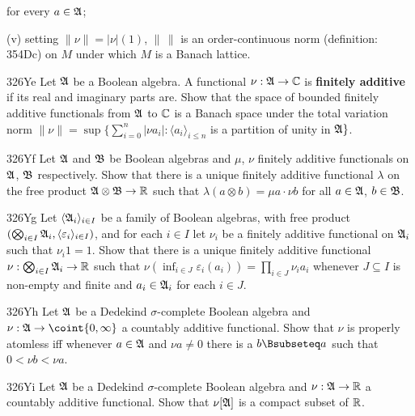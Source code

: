 {

\noindent for every $a\in\frak A$;

\quad(v) setting $\|\nu\|=|\nu|(1)$, $\|\,\|$ is an order-continuous
norm (definition:  354Dc) on $M$ under which $M$ is a Banach lattice.

\spheader 326Ye Let $\frak A$ be a Boolean algebra.   A functional
$\nu:\frak A\to\Bbb C$ is {\bf finitely additive} if its real and
imaginary parts are.
Show that the space of bounded finitely additive functionals from
$\frak A$ to $\Bbb C$ is a Banach space under the total variation norm
$\|\nu\|=\sup\{\sum_{i=0}^n|\nu a_i|:\langle a_i\rangle_{i\le n}$
is a partition of unity in $\frak A\}$.

\spheader 326Yf Let $\frak A$ and $\frak B$ be Boolean algebras and
$\mu$, $\nu$ finitely additive functionals on $\frak A$, $\frak B$
respectively.   Show that there is a unique finitely
additive functional $\lambda$ on the free product
$\frak A\otimes\frak B\to\Bbb R$ such that
$\lambda(a\otimes b)=\mu a\cdot\nu b$ for all $a\in\frak A$,
$b\in\frak B$.

\spheader 326Yg Let $\langle\frak A_i\rangle_{i\in I}$ be a family of
Boolean algebras, with free product
$(\bigotimes_{i\in I}\frak A_i,\langle\varepsilon_i\rangle_{i\in I})$,
and for each $i\in I$ let
$\nu_i$ be a finitely additive functional on $\frak A_i$ such that
$\nu_i1=1$.   Show that there is a unique finitely additive functional
$\nu:\bigotimes_{i\in I}\frak A_i\to\Bbb R$ such that
$\nu(\inf_{i\in J}\varepsilon_i(a_i))=\prod_{i\in J}\nu_ia_i$ whenever
$J\subseteq I$ is
non-empty and finite and $a_i\in\frak A_i$ for each $i\in J$.

\spheader 326Yh
Let $\frak A$ be a Dedekind $\sigma$-complete Boolean
algebra and $\nu:\frak A\to\coint{0,\infty}$ a countably additive
functional.   Show that $\nu$ is
properly atomless iff whenever $a\in\frak A$ and
$\nu a\ne 0$ there is a $b\Bsubseteq a$ such that $0<\nu b<\nu a$.

\spheader 326Yi
Let $\frak A$ be a Dedekind $\sigma$-complete Boolean
algebra and $\nu:\frak A\to\Bbb R$ a countably additive functional.   Show
that $\nu[\frak A]$ is a compact subset of $\Bbb R$.

}
